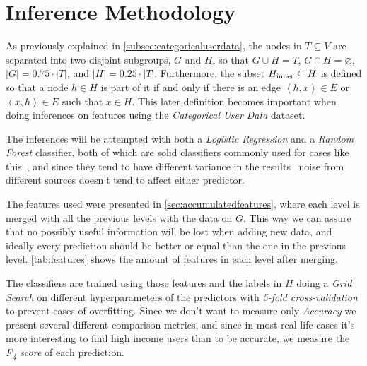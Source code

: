 

\section{Inference Methodology}
\label{sec:inference_methodology}

As previously explained in \cref{subsec:categoricaluserdata}, the nodes in $T \subseteq V$ are separated into two disjoint subgroups, $G$ and $H$, so that $G \cup H = T$, $G \cap H = \varnothing$, $\left| G \right| = 0.75 \cdot \left| T \right|$, and $\left| H \right| = 0.25 \cdot \left| T \right|$. Furthermore, the subset $H_{\operatorname{inner}} \subseteq H$ is defined so that a node $h \in H$ is part of it if and only if there is an edge $\left< h, x \right> \in E$ or $\left< x, h \right> \in E$ such that $x \in H$\footnotemark{}. This later definition becomes important when doing inferences on features using the \emph{Categorical User Data} dataset.


The inferences will be attempted with both a \emph{Logistic Regression} and a \emph{Random Forest} classifier, both of which are solid classifiers commonly used for cases like this~\cite{binaryevaluation}, and since they tend to have different variance in the results~\cite{ting2016} noise from different sources doesn't tend to affect either predictor.

The features used were presented in \cref{sec:accumulatedfeatures}, where each level is merged with all the previous levels with the data on $G$. This way we can assure that no possibly useful information will be lost when adding new data, and ideally every prediction should be better or equal than the one in the previous level. \cref{tab:features} shows the amount of features in each level after merging.

The classifiers are trained using those features and the labels in $H$ doing a \emph{Grid Search} on different hyperparameters of the predictors with \emph{5-fold cross-validation} to prevent cases of overfitting. Since we don't want to measure only \emph{Accuracy} we present several different comparison metrics, and since in most real life cases it's more interesting to find high income users than to be accurate\footnotemark{}, we measure the \emph{F\textsubscript{4} score} of each prediction.


